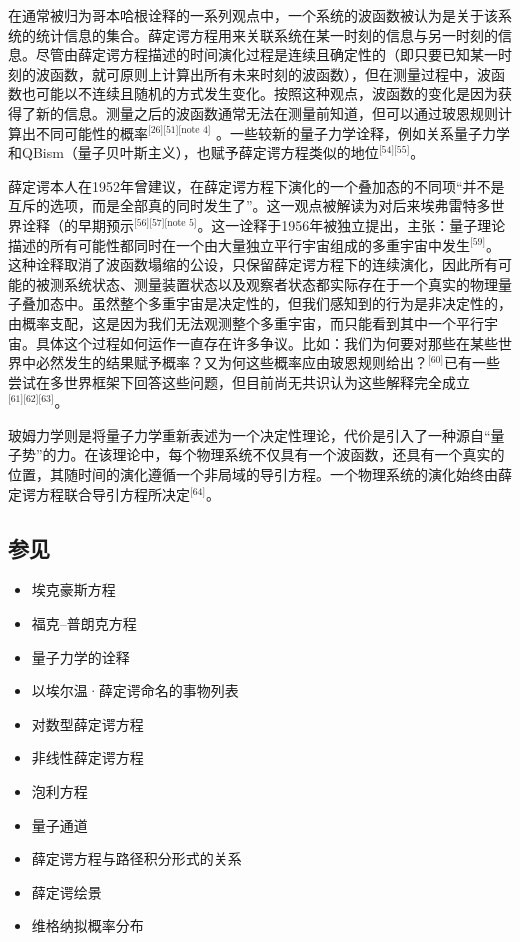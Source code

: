 在通常被归为哥本哈根诠释的一系列观点中，一个系统的波函数被认为是关于该系统的统计信息的集合。薛定谔方程用来关联系统在某一时刻的信息与另一时刻的信息。尽管由薛定谔方程描述的时间演化过程是连续且确定性的（即只要已知某一时刻的波函数，就可原则上计算出所有未来时刻的波函数），但在测量过程中，波函数也可能以不连续且随机的方式发生变化。按照这种观点，波函数的变化是因为获得了新的信息。测量之后的波函数通常无法在测量前知道，但可以通过玻恩规则计算出不同可能性的概率\(^\text{[26][51][note 4]}\) 。一些较新的量子力学诠释，例如关系量子力学和QBism（量子贝叶斯主义），也赋予薛定谔方程类似的地位\(^\text{[54][55]}\)。

薛定谔本人在1952年曾建议，在薛定谔方程下演化的一个叠加态的不同项“并不是互斥的选项，而是全部真的同时发生了”。这一观点被解读为对后来埃弗雷特多世界诠释（的早期预示\(^\text{[56][57][note 5]}\)。这一诠释于1956年被独立提出，主张：量子理论描述的所有可能性都同时在一个由大量独立平行宇宙组成的多重宇宙中发生\(^\text{[59]}\)。这种诠释取消了波函数塌缩的公设，只保留薛定谔方程下的连续演化，因此所有可能的被测系统状态、测量装置状态以及观察者状态都实际存在于一个真实的物理量子叠加态中。虽然整个多重宇宙是决定性的，但我们感知到的行为是非决定性的，由概率支配，这是因为我们无法观测整个多重宇宙，而只能看到其中一个平行宇宙。具体这个过程如何运作一直存在许多争议。比如：我们为何要对那些在某些世界中必然发生的结果赋予概率？又为何这些概率应由玻恩规则给出？\(^\text{[60]}\)已有一些尝试在多世界框架下回答这些问题，但目前尚无共识认为这些解释完全成立\(^\text{[61][62][63]}\)。

玻姆力学则是将量子力学重新表述为一个决定性理论，代价是引入了一种源自“量子势”的力。在该理论中，每个物理系统不仅具有一个波函数，还具有一个真实的位置，其随时间的演化遵循一个非局域的导引方程。一个物理系统的演化始终由薛定谔方程联合导引方程所决定\(^\text{[64]}\)。
\subsection{参见}
\begin{itemize}
\item 埃克豪斯方程
\item 福克–普朗克方程
\item 量子力学的诠释
\item 以埃尔温·薛定谔命名的事物列表
\item 对数型薛定谔方程
\item 非线性薛定谔方程
\item 泡利方程
\item 量子通道
\item 薛定谔方程与路径积分形式的关系
\item 薛定谔绘景
\item 维格纳拟概率分布
\end{itemize}
